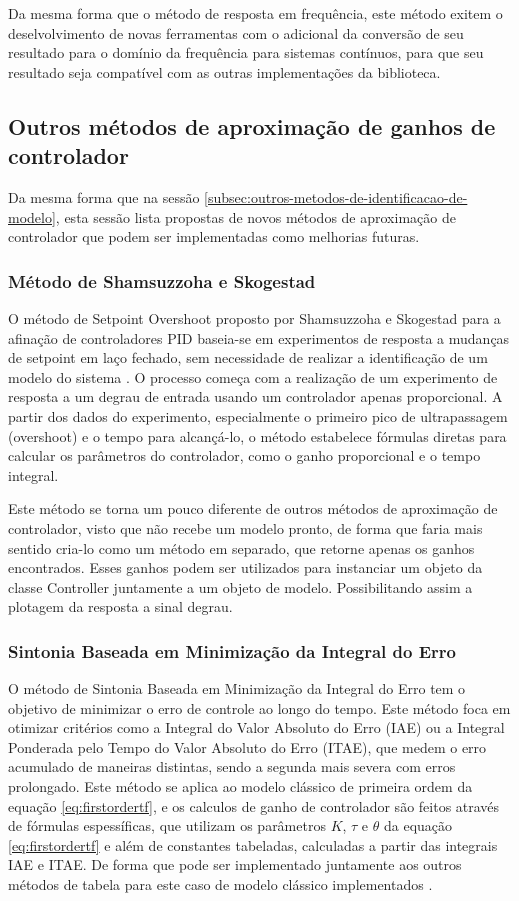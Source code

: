 Da mesma forma que o método de resposta em frequência, este método exitem o deselvolvimento de novas ferramentas
com o adicional da conversão de seu resultado para o domínio da frequência para sistemas contínuos, para que seu
resultado seja compatível com as outras implementações da biblioteca.


\subsection{Outros métodos de aproximação de ganhos de controlador}
Da mesma forma que na sessão \ref{subsec:outros-metodos-de-identificacao-de-modelo}, esta sessão lista propostas
de novos métodos de aproximação de controlador que podem ser implementadas como melhorias futuras.

\subsubsection{Método de Shamsuzzoha e Skogestad}
O método de Setpoint Overshoot proposto por Shamsuzzoha e Skogestad para a afinação de controladores PID baseia-se em
experimentos de resposta a mudanças de setpoint em laço fechado, sem necessidade de realizar a identificação de um
modelo do sistema \cite{skoge}.
O processo começa com a realização de um experimento de resposta a um degrau de entrada usando um controlador apenas
proporcional.
A partir dos dados do experimento, especialmente o primeiro pico de ultrapassagem (overshoot) e o tempo para alcançá-lo,
o método estabelece fórmulas diretas para calcular os parâmetros do controlador, como o ganho proporcional e o tempo
integral.

Este método se torna um pouco diferente de outros métodos de aproximação de controlador, visto que não recebe um modelo
pronto, de forma que faria mais sentido cria-lo como um método em separado, que retorne apenas os ganhos encontrados.
Esses ganhos podem ser utilizados para instanciar um objeto da classe Controller juntamente a um objeto de modelo.
Possibilitando assim a plotagem da resposta a sinal degrau.

\subsubsection{Sintonia Baseada em Minimização da Integral do Erro}
O método de Sintonia Baseada em Minimização da Integral do Erro tem o objetivo de minimizar o erro de controle ao
longo do tempo.
Este método foca em otimizar critérios como a Integral do Valor Absoluto do Erro (IAE) ou a Integral Ponderada pelo
Tempo do Valor Absoluto do Erro (ITAE), que medem o erro acumulado de maneiras distintas, sendo a segunda mais severa
com erros prolongado.
Este método se aplica ao modelo clássico de primeira ordem da equação \eqref{eq:firstordertf}, e os calculos de ganho
de controlador são feitos através de fórmulas espessíficas, que utilizam os parâmetros $K$, $\tau$ e $\theta$ da equação
\eqref{eq:firstordertf} e além de constantes tabeladas, calculadas a partir das integrais IAE e ITAE.
De forma que pode ser implementado juntamente aos outros métodos de tabela para este caso de modelo clássico
implementados \cite{apostpidsint}.

